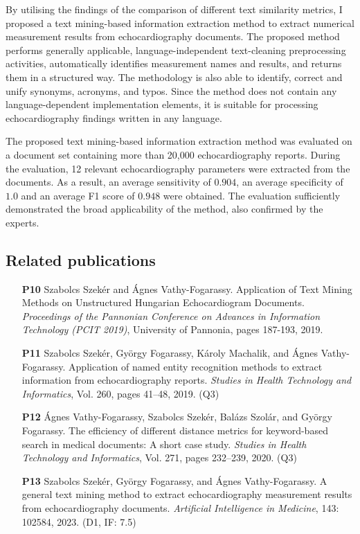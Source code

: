 By utilising the findings of the comparison of different text similarity metrics, I proposed a text mining-based information extraction method to extract numerical measurement results from echocardiography documents. The proposed method performs generally applicable, language-independent text-cleaning preprocessing activities, automatically identifies measurement names and results, and returns them in a structured way. The methodology is also able to identify, correct and unify synonyms, acronyms, and typos. Since the method does not contain any language-dependent implementation elements, it is suitable for processing echocardiography findings written in any language.

The proposed text mining-based information extraction method was evaluated on a document set containing more than 20,000 echocardiography reports. During the evaluation, 12 relevant echocardiography parameters were extracted from the documents. As a result, an average sensitivity of $0.904$, an average specificity of $1.0$ and an average F1 score of $0.948$ were obtained. The evaluation sufficiently demonstrated the broad applicability of the method, also confirmed by the experts.

\subsection*{Related publications}

\begin{itemize}
	\item[\textbf{P10}] Szabolcs Szekér and Ágnes Vathy-Fogarassy. Application of Text Mining Methods on Unstructured Hungarian Echocardiogram Documents. \textit{Proceedings of the Pannonian Conference on Advances in Information Technology (PCIT 2019)}, University of Pannonia, pages 187-193, 2019. 
	\item[\textbf{P11}] Szabolcs Szekér, György Fogarassy, Károly Machalik, and Ágnes Vathy-Fogarassy. Application of named entity recognition methods to extract information from echocardiography reports. \textit{Studies in Health Technology and Informatics}, Vol. 260, pages 41–48, 2019. (Q3)
	\item[\textbf{P12}] Ágnes Vathy-Fogarassy, Szabolcs Szekér, Balázs Szolár, and György Fogarassy. The efficiency of different distance metrics for keyword-based search in medical documents: A short case study. \textit{Studies in Health Technology and Informatics}, Vol. 271, pages 232–239, 2020. (Q3) 	      	
	\item[\textbf{P13}] Szabolcs Szekér, György Fogarassy, and Ágnes Vathy-Fogarassy. A general text mining method to extract echocardiography measurement results from echocardiography documents. \textit{Artificial Intelligence in Medicine}, 143: 102584, 2023. (D1, IF: 7.5)
\end{itemize}
